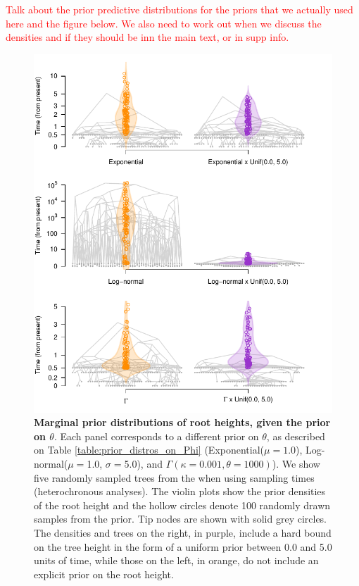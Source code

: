\documentclass[10pt,letterpaper]{article}
\begin{document}
\textcolor{red}{Talk about the prior predictive distributions for the priors that we actually used here and the figure below. We also need to work out when we discuss the densities and if they should be inn the main text, or in supp info.}

\begin{figure}[!h]
	\begin{center}
		\includegraphics[width=14cm]{sandbox_figures/prior_tree_distros.pdf}\newline
		\vspace{-0.5cm}
		\caption{\textbf{Marginal prior distributions of root heights, given the prior on $\theta$}. Each panel corresponds to a different prior on $\theta$, as described on Table \ref{table:prior_distros_on_Phi} (Exponential($\mu=1.0$), Log-normal($\mu=$1.0, $\sigma=$5.0), and $\Gamma(\kappa=0.001, \theta=1000)$). We show five randomly sampled trees from the when using sampling times (heterochronous analyses). The violin plots show the prior densities of the root height and the hollow circles denote 100 randomly drawn samples from the prior. Tip nodes are shown with solid grey circles. The densities and trees on the right, in purple, include a hard bound on the tree height in the form of a uniform prior between 0.0 and 5.0 units of time, while those on the left, in orange, do not include an explicit prior on the root height.}
		\label{figure:prior_tree_distros}
	\end{center}
\end{figure}
\end{document}
